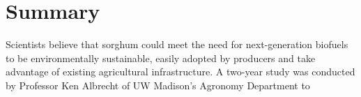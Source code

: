 \section*{Summary}\label{Sec_Summary}
Scientists believe that sorghum could meet the need for next-generation biofuels to be environmentally sustainable, easily adopted by producers and take advantage of existing agricultural infrastructure\cite{Dweikat_etal_2012_BBB}. A two-year study was conducted by Professor Ken Albrecht of UW Madison's Agronomy Department to 


